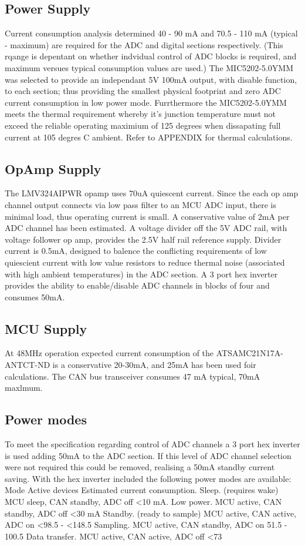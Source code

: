 \subsection{Power Supply}
Current consumption analysis determined 40 - 90 mA and 70.5 - 110 mA (typical - maximum) are required for the ADC and digital sections respectively. (This rqange is depentant on whether indvidual control of ADC blocks is required, and maximum versues typical consumption values are used.) 
The MIC5202-5.0YMM was selected to provide an independant 5V 100mA output, with disable function, to each section; thus providing the smallest physical footprint and zero ADC current consumption in low power mode. Furrthermore the MIC5202-5.0YMM meets the thermal requirement whereby it's junction temperature must not exceed the reliable operating maximium of 125 degrees when dissapating full current at 105 degres C ambient. Refer to APPENDIX for thermal calculations.
 
\subsection{OpAmp Supply}
The LMV324AIPWR opamp uses 70uA quiescent current. Since the each op amp channel output connects via low pass filter to an MCU ADC input, there is minimal load, thus operating current is small. A conservative value of 2mA per ADC channel has been estimated.
A voltage divider off the 5V ADC rail, with voltage follower op amp, provides the 2.5V half rail reference supply. Divider current is 0.5mA, designed to balence the conflicting requirements of low quiescient current with low value resistors to reduce thermal noise (associated with high ambient temperatures) in the ADC section.
A 3 port hex inverter provides the ability to enable/disable ADC channels in blocks of four and consumes 50mA.

\subsection{MCU Supply}
At 48MHz operation expected current consumption of the ATSAMC21N17A-ANTCT-ND is a conservative 20-30mA, and 25mA has been used foir calculations. The CAN bus transceiver consumes 47 mA typical, 70mA maxlmum.

\subsection{Power modes}
To meet the specification regarding control of ADC channels a 3 port hex inverter is used adding 50mA to the ADC section. If this level of ADC channel selection were not required this could be removed, realising a 50mA standby current saving. With the hex inverter included the following power modes are available:
Mode							Active devices	 					Estimated current consumption.
Sleep. (requires wake)				MCU sleep, CAN standby, ADC off 		<10 mA. 
Low power. 						MCU active, CAN standby, ADC off		<30 mA
Standby. (ready to sample)		MCU active, CAN active, ADC on		<98.5 - <148.5
Sampling.						MCU active, CAN standby, ADC on		51.5 - 100.5 	
Data transfer.					MCU active, CAN active, ADC off		<73